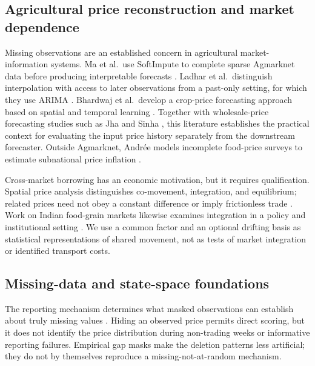 \documentclass[sigconf,nonacm,balance=false]{acmart}
\begin{document}
\subsection{Agricultural price reconstruction and market dependence}

Missing observations are an established concern in agricultural market-information systems. Ma et al.\ use SoftImpute to complete sparse Agmarknet data before producing interpretable forecasts \cite{ma2019}. Ladhar et al.\ distinguish interpolation with access to later observations from a past-only setting, for which they use ARIMA \cite{ladhar2023}. Bhardwaj et al.\ develop a crop-price forecasting approach based on spatial and temporal learning \cite{bhardwaj2023}. Together with wholesale-price forecasting studies such as Jha and Sinha \cite{jha2014}, this literature establishes the practical context for evaluating the input price history separately from the downstream forecaster. Outside Agmarknet, Andr{\'e}e models incomplete food-price surveys to estimate subnational price inflation \cite{andree2021}.

Cross-market borrowing has an economic motivation, but it requires qualification. Spatial price analysis distinguishes co-movement, integration, and equilibrium; related prices need not obey a constant difference or imply frictionless trade \cite{fackler2001,barrett2002}. Work on Indian food-grain markets likewise examines integration in a policy and institutional setting \cite{ghosh2011}. We use a common factor and an optional drifting basis as statistical representations of shared movement, not as tests of market integration or identified transport costs.

\subsection{Missing-data and state-space foundations}

The reporting mechanism determines what masked observations can establish about truly missing values \cite{rubin1976,schafer2002,little2019}. Hiding an observed price permits direct scoring, but it does not identify the price distribution during non-trading weeks or informative reporting failures. Empirical gap masks make the deletion patterns less artificial; they do not by themselves reproduce a missing-not-at-random mechanism.
\end{document}
